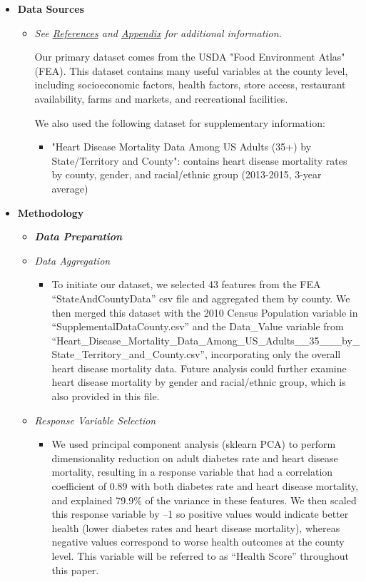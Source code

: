 \documentclass{article}
\begin{document}
\begin{itemize}[leftmargin=0pt]
\item[] \textbf{Data Sources}
\begin{itemize}
    \item \textit{See \hyperref[ref:bib]{References} and \hyperref[ref:fea]{Appendix} for additional information.}

    Our primary dataset comes from the USDA "Food Environment Atlas" (FEA)\cite{usda_food_environment_atlas}. This dataset contains many useful variables at the county level, including socioeconomic factors, health factors, store access, restaurant availability, farms and markets, and recreational facilities.

    We also used the following dataset for supplementary information:
    \begin{itemize}
        \item[] "Heart Disease Mortality Data Among US Adults (35+) by State/Territory and County": contains heart disease mortality rates by county, gender, and racial/ethnic group (2013-2015, 3-year average)\cite{heart_disease_mortality_data}
    \end{itemize}
\end{itemize}



\item[] \textbf{Methodology}
\begin{itemize}
\item[] \textbf{\textit{Data Preparation}} 

\item[] \textit{Data Aggregation}
\begin{itemize}
\item[] To initiate our dataset, we selected 43 features from the FEA “StateAndCountyData” csv file and aggregated them by county. We then merged this dataset with the 2010 Census Population variable in “SupplementalDataCounty.csv” and the Data\_Value variable from \\“Heart\_Disease\_Mortality\_Data\_Among\_US\_Adults\_\_35\_\_\_by\_State\_Territory\_and\_County.csv”, incorporating only the overall heart disease mortality data. Future analysis could further examine heart disease mortality by gender and racial/ethnic group, which is also provided in this file. 
\end{itemize}

\item[] \textit{Response Variable Selection}
\begin{itemize}
    \item[] We used principal component analysis (sklearn PCA) to perform dimensionality reduction on adult diabetes rate and heart disease mortality, resulting in a response variable that had a correlation coefficient of 0.89 with both diabetes rate and heart disease mortality, and explained 79.9\% of the variance in these features. We then scaled this response variable by –1 so positive values would indicate better health (lower diabetes rates and heart disease mortality), whereas negative values correspond to worse health outcomes at the county level. This variable will be referred to as “Health Score” throughout this paper. 
\end{itemize}


\end{itemize}
\end{itemize}
\end{document}
